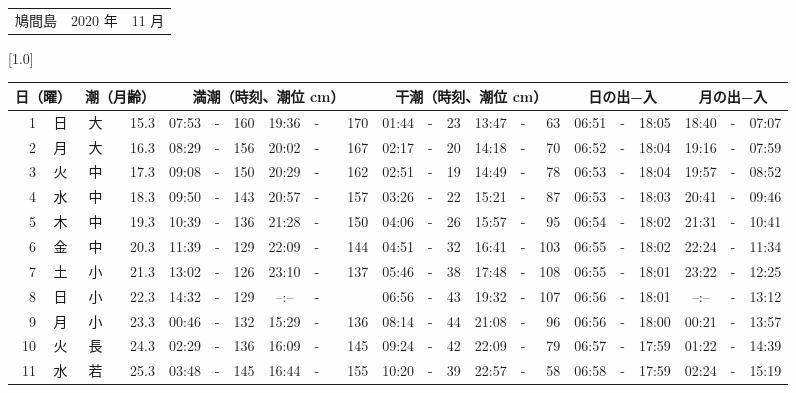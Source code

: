 \documentclass[12pt,a4j]{jsarticle}
\begin{document}
 \begin{table}[htbp]
 \begin{center}
 \begin{tabular}{lcc}
 \LARGE{鳩間島}  & \large{2020 年} & \large{11 月} \\
 \end{tabular}
 \end{center}
 \begin{center}
    \scalebox{0.7}[1.0]{
    \begin{tabular}{|rc|cr|ccrccr|ccrccr|ccc|ccc|}
    \hline
    \multicolumn{2}{|c|}{日（曜）} & \multicolumn{2}{c|}{潮（月齢）} & \multicolumn{6}{c|}{満潮（時刻、潮位 cm）} & \multicolumn{6}{c|}{干潮（時刻、潮位 cm）} & \multicolumn{3}{c|}{日の出−入} &  \multicolumn{3}{c|}{月の出−入}\\
 \hline
 1 & 日 & 大 & 15.3 &  07:53 &-& 160 &  19:36 &-& 170 &  01:44 &-&  23 &  13:47 &-&  63 & 06:51 & -& 18:05 & 18:40 & -& 07:07 \\
 2 & 月 & 大 & 16.3 &  08:29 &-& 156 &  20:02 &-& 167 &  02:17 &-&  20 &  14:18 &-&  70 & 06:52 & -& 18:04 & 19:16 & -& 07:59 \\
 3 & 火 & 中 & 17.3 &  09:08 &-& 150 &  20:29 &-& 162 &  02:51 &-&  19 &  14:49 &-&  78 & 06:53 & -& 18:04 & 19:57 & -& 08:52 \\
 4 & 水 & 中 & 18.3 &  09:50 &-& 143 &  20:57 &-& 157 &  03:26 &-&  22 &  15:21 &-&  87 & 06:53 & -& 18:03 & 20:41 & -& 09:46 \\
 5 & 木 & 中 & 19.3 &  10:39 &-& 136 &  21:28 &-& 150 &  04:06 &-&  26 &  15:57 &-&  95 & 06:54 & -& 18:02 & 21:31 & -& 10:41 \\
 6 & 金 & 中 & 20.3 &  11:39 &-& 129 &  22:09 &-& 144 &  04:51 &-&  32 &  16:41 &-& 103 & 06:55 & -& 18:02 & 22:24 & -& 11:34 \\
 7 & 土 & 小 & 21.3 &  13:02 &-& 126 &  23:10 &-& 137 &  05:46 &-&  38 &  17:48 &-& 108 & 06:55 & -& 18:01 & 23:22 & -& 12:25 \\
 8 & 日 & 小 & 22.3 &  14:32 &-& 129 &  --:-- &-&~~~~~ &  06:56 &-&  43 &  19:32 &-& 107 & 06:56 & -& 18:01 & --:-- & -& 13:12 \\
 9 & 月 & 小 & 23.3 &  00:46 &-& 132 &  15:29 &-& 136 &  08:14 &-&  44 &  21:08 &-&  96 & 06:56 & -& 18:00 & 00:21 & -& 13:57 \\
10 & 火 & 長 & 24.3 &  02:29 &-& 136 &  16:09 &-& 145 &  09:24 &-&  42 &  22:09 &-&  79 & 06:57 & -& 17:59 & 01:22 & -& 14:39 \\
11 & 水 & 若 & 25.3 &  03:48 &-& 145 &  16:44 &-& 155 &  10:20 &-&  39 &  22:57 &-&  58 & 06:58 & -& 17:59 & 02:24 & -& 15:19 \\

\end{tabular}}
\end{center}
\end{table}
\end{document}
